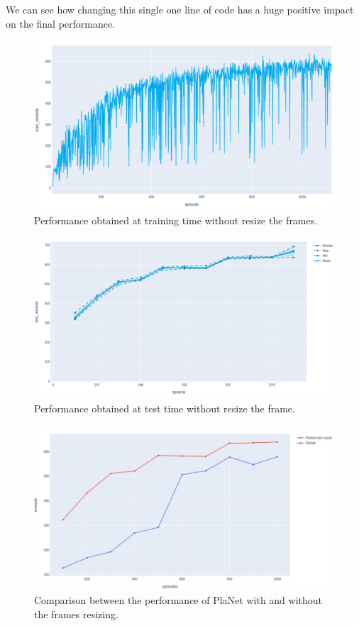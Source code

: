 We can see how changing this single one line of code has a huge positive impact on the final performance.

\begin{figure}[H]
\centering
\includegraphics[width=1. \textwidth, height=.3\textheight]{pictures/train_planet_puro}
\caption{ Performance obtained at training time without resize the frames.}
\end{figure}

\begin{figure}[H]
\centering
\includegraphics[width=1. \textwidth, height=.3\textheight]{pictures/test_planet_puro}
\caption{ Performance obtained at test time without resize the frame.}
\end{figure}

\begin{figure}[H]
\centering
\includegraphics[width=1. \textwidth, height=.3\textheight]{pictures/resize_vs_pure}
\caption{ Comparison between the performance of PlaNet with and without the frames resizing.}
\end{figure}

